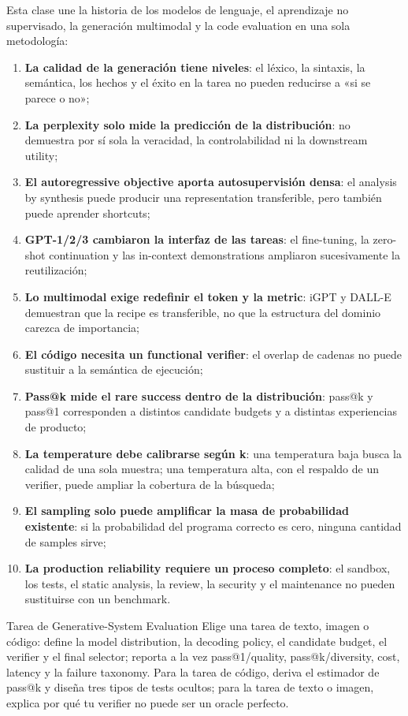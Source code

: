 \documentclass[a4paper]{article}
\begin{document}
Esta clase une la historia de los modelos de lenguaje, el aprendizaje no supervisado, la generación multimodal y la code evaluation en una sola metodología:

\begin{enumerate}
  \item \textbf{La calidad de la generación tiene niveles}: el léxico, la sintaxis, la semántica, los hechos y el éxito en la tarea no pueden reducirse a «si se parece o no»;
  \item \textbf{La perplexity solo mide la predicción de la distribución}: no demuestra por sí sola la veracidad, la controlabilidad ni la downstream utility;
  \item \textbf{El autoregressive objective aporta autosupervisión densa}: el analysis by synthesis puede producir una representation transferible, pero también puede aprender shortcuts;
  \item \textbf{GPT-1/2/3 cambiaron la interfaz de las tareas}: el fine-tuning, la zero-shot continuation y las in-context demonstrations ampliaron sucesivamente la reutilización;
  \item \textbf{Lo multimodal exige redefinir el token y la metric}: iGPT y DALL-E demuestran que la recipe es transferible, no que la estructura del dominio carezca de importancia;
  \item \textbf{El código necesita un functional verifier}: el overlap de cadenas no puede sustituir a la semántica de ejecución;
  \item \textbf{Pass@k mide el rare success dentro de la distribución}: pass@k y pass@1 corresponden a distintos candidate budgets y a distintas experiencias de producto;
  \item \textbf{La temperature debe calibrarse según k}: una temperatura baja busca la calidad de una sola muestra; una temperatura alta, con el respaldo de un verifier, puede ampliar la cobertura de la búsqueda;
  \item \textbf{El sampling solo puede amplificar la masa de probabilidad existente}: si la probabilidad del programa correcto es cero, ninguna cantidad de samples sirve;
  \item \textbf{La production reliability requiere un proceso completo}: el sandbox, los tests, el static analysis, la review, la security y el maintenance no pueden sustituirse con un benchmark.
\end{enumerate}

\begin{importantbox}{Tarea de Generative-System Evaluation}
Elige una tarea de texto, imagen o código: define la model distribution, la decoding policy, el candidate budget, el verifier y el final selector; reporta a la vez pass@1/quality, pass@k/diversity, cost, latency y la failure taxonomy. Para la tarea de código, deriva el estimador de pass@k y diseña tres tipos de tests ocultos; para la tarea de texto o imagen, explica por qué tu verifier no puede ser un oracle perfecto.
\end{importantbox}
\end{document}
